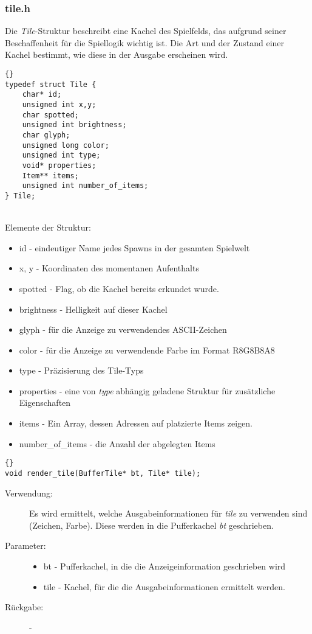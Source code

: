 \documentclass[11pt,a4paper,notitlepage]{report}
\begin{document}
	\newpage
	\subsubsection*{tile.h}
Die \textit{Tile}-Struktur beschreibt eine Kachel des Spielfelds, das aufgrund seiner Beschaffenheit für die Spiellogik wichtig ist. Die Art und der Zustand einer Kachel bestimmt, wie diese in der Ausgabe erscheinen wird.

		\begin{lstlisting}[caption=Tile]{}
typedef struct Tile {
	char* id;
	unsigned int x,y;
	char spotted;
	unsigned int brightness;
	char glyph;
	unsigned long color;
	unsigned int type;
	void* properties;
	Item** items;
	unsigned int number_of_items;
} Tile;
		\end{lstlisting} \hspace*{\fill} \\
Elemente der Struktur:
		\begin{itemize}
			\item id - eindeutiger Name jedes Spawns in der gesamten Spielwelt
			\item x, y - Koordinaten des momentanen Aufenthalts
			\item spotted - Flag, ob die Kachel bereits erkundet wurde.
			\item brightness - Helligkeit auf dieser Kachel
			\item glyph - für die Anzeige zu verwendendes ASCII-Zeichen
			\item color - für die Anzeige zu verwendende Farbe im Format R8G8B8A8
			\item type - Präzisierung des Tile-Typs
			\item properties - eine von \textit{type} abhängig geladene Struktur für zusätzliche Eigenschaften
			\item items - Ein Array, dessen Adressen auf platzierte Items zeigen.
			\item number\_of\_items - die Anzahl der abgelegten Items
		\end{itemize}
		
		\begin{lstlisting}[caption=render\_tile]{}
void render_tile(BufferTile* bt, Tile* tile);
		\end{lstlisting}
		
	\begin{description}
		\item[Verwendung:] Es wird ermittelt, welche Ausgabeinformationen für \textit{tile} zu verwenden sind (Zeichen, Farbe). Diese werden in die Pufferkachel \textit{bt} geschrieben.
		\item[Parameter:] \hfill
		\begin{itemize}
			\item bt - Pufferkachel, in die die Anzeigeinformation geschrieben wird
			\item tile - Kachel, für die die Ausgabeinformationen ermittelt werden.
		\end{itemize}
		\item[Rückgabe:] -
	\end{description}
	
\end{document}
